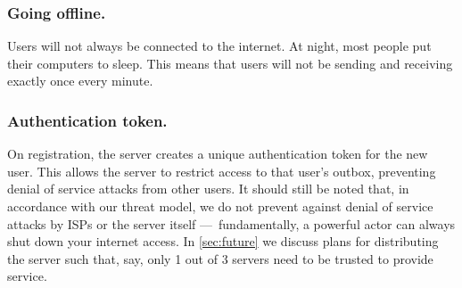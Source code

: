 

\subsubsection{Going offline.} Users will not always be connected to the internet. At night, most people put their computers to sleep. This means that users will not be sending and receiving exactly once every minute. 

\subsubsection{Authentication token.} 
On registration, the server creates a unique authentication token for the new user. This allows the server to restrict access to that user's outbox, preventing denial of service attacks from other users. It should still be noted that, in accordance with our threat model, we do not prevent against denial of service attacks by ISPs or the server itself — fundamentally, a powerful actor can always shut down your internet access. In \cref{sec:future} we discuss plans for distributing the server such that, say, only 1 out of 3 servers need to be trusted to provide service.


